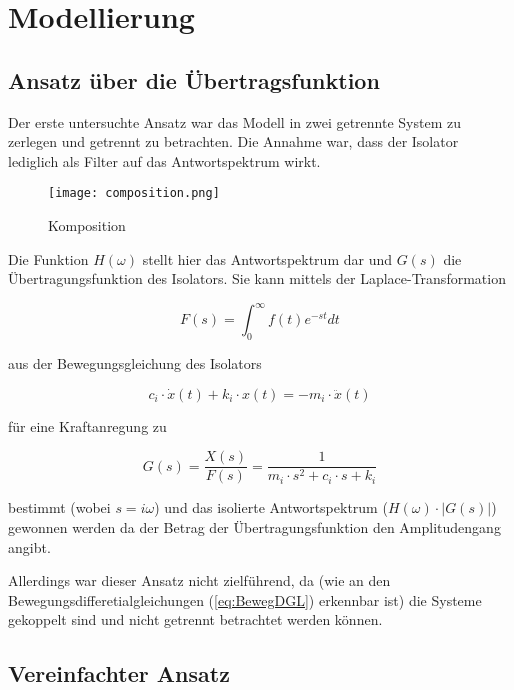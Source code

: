 \section{Modellierung}
\label{sec:modellierung}

\subsection{Ansatz über die Übertragsfunktion}
\label{sec:ansatzfunktion}

Der erste untersuchte Ansatz war das Modell in zwei getrennte System zu zerlegen und getrennt zu betrachten.
Die Annahme war, dass der Isolator lediglich als Filter auf das Antwortspektrum wirkt.

\begin{figure}[H]
    \centering
    \texttt{[image: composition.png]}
    \caption{Komposition}
    \label{fig:composition}
\end{figure}

Die Funktion $H(\omega)$ stellt hier das Antwortspektrum dar und $G(s)$ die Übertragungsfunktion des Isolators.
Sie kann mittels der Laplace-Transformation

\begin{equation} \label{laplace}
F(s) = \int_{0}^{\infty} f(t)e^{-st}dt
\end{equation}

aus der Bewegungsgleichung des Isolators \cite{Kramer}

\begin{equation}\label{eq:bewegungsgleichung}
c_i \cdot \dot x(t) + k_i \cdot x(t) = - m_i \cdot \ddot x(t)
\end{equation}

für eine Kraftanregung zu

\begin{equation} \label{laplace2}
G(s)=\frac{X(s)}{F(s)} = \frac{1}{m_i \cdot s^2 + c_i \cdot s + k_i}
\end{equation}

bestimmt (wobei $s = i \omega$) und das isolierte Antwortspektrum ($H(\omega) \cdot |G(s)|$) gewonnen werden da der Betrag der Übertragungsfunktion den Amplitudengang angibt.

Allerdings war dieser Ansatz nicht zielführend, da (wie an den Bewegungsdifferetialgleichungen (\cref{eq:BewegDGL}) erkennbar ist) die Systeme gekoppelt sind und nicht getrennt betrachtet werden können.

\subsection{Vereinfachter Ansatz}
\label{sec:ansatzvereinfacht}

